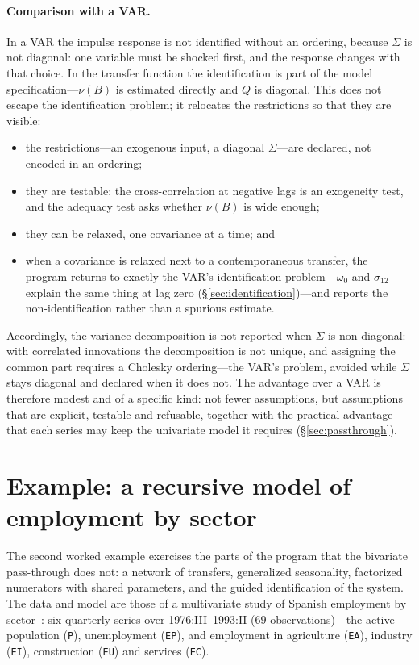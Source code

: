 \documentclass[11pt,a4paper]{article}
\theoremstyle{plain}
\theoremstyle{remark}
\begin{document}
\paragraph{Comparison with a VAR.} In a VAR the impulse response is not identified
without an ordering, because $\Sigma$ is not diagonal: one variable must be shocked
first, and the response changes with that choice. In the transfer function the
identification is part of the model specification---$\nu(B)$ is estimated directly
and $Q$ is diagonal. This does not escape the identification problem; it relocates
the restrictions so that they are visible:

\begin{itemize}
\item the restrictions---an exogenous input, a diagonal $\Sigma$---are declared, not
  encoded in an ordering;
\item they are testable: the cross-correlation at negative lags is an exogeneity
  test, and the adequacy test asks whether $\nu(B)$ is wide enough;
\item they can be relaxed, one covariance at a time; and
\item when a covariance is relaxed next to a contemporaneous transfer, the program
  returns to exactly the VAR's identification problem---$\omega_0$ and $\sigma_{12}$
  explain the same thing at lag zero (\S\ref{sec:identification})---and reports the
  non-identification rather than a spurious estimate.
\end{itemize}

Accordingly, the variance decomposition is not reported when $\Sigma$ is
non-diagonal: with correlated innovations the decomposition is not unique, and
assigning the common part requires a Cholesky ordering---the VAR's problem, avoided
while $\Sigma$ stays diagonal and declared when it does not. The advantage over a VAR
is therefore modest and of a specific kind: not fewer assumptions, but assumptions
that are explicit, testable and refusable, together with the practical advantage that
each series may keep the univariate model it requires (\S\ref{sec:passthrough}).

\section{Example: a recursive model of employment by sector}
\label{sec:m6}

The second worked example exercises the parts of the program that the bivariate
pass-through does not: a network of transfers, generalized seasonality, factorized
numerators with shared parameters, and the guided identification of the system. The
data and model are those of a multivariate study of Spanish employment by
sector~\cite{relloso1997}: six quarterly series over 1976:III--1993:II (69
observations)---the active population (\texttt{P}), unemployment (\texttt{EP}), and
employment in agriculture (\texttt{EA}), industry (\texttt{EI}), construction
(\texttt{EU}) and services (\texttt{EC}).
\end{document}
